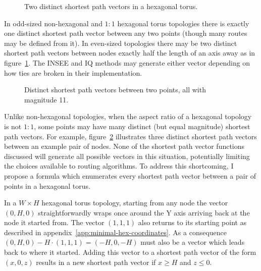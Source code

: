 			\begin{figure}
				\center
				
				\caption{Two distinct shortest path vectors in a hexagonal torus.}
				\label{fig:wrap-alternatives}
			\end{figure}
			
			In odd-sized non-hexagonal and $1:1$ hexagonal torus topologies there is
			exactly one distinct shortest path vector between any two points (though
			many routes may be defined from it). In even-sized topologies there may
			be two distinct shortest path vectors between nodes exactly half the
			length of an axis away as in figure~\ref{fig:wrap-alternatives}. The
			INSEE and IQ methods may generate either vector depending on how ties are
			broken in their implementation.
			
			\begin{figure}
				\center
				
				\caption[Distinct shortest path vectors in non-square toruses.]%
				{Distinct shortest path vectors between two points, all with
				magnitude 11.}
				\label{fig:spiralling}
			\end{figure}
			
			Unlike non-hexagonal topologies, when the aspect ratio of a hexagonal
			topology is not $1:1$, some points may have many distinct (but equal
			magnitude) shortest path vectors.  For example,
			figure~\ref{fig:spiralling} illustrates three distinct shortest path
			vectors between an example pair of nodes. None of the shortest path vector
			functions discussed will generate all possible vectors in this situation,
			potentially limiting the choices available to routing algorithms.  To
			address this shortcoming, I propose a formula which enumerates every
			shortest path vector between a pair of points in a hexagonal torus.
			
			In a $W \times H$ hexagonal torus topology, starting from any node the
			vector $(0, H, 0)$ straightforwardly wraps once around the Y axis
			arriving back at the node it started from. The vector $(1,1,1)$ also
			returns to its starting point as described in
			appendix~\ref{app:minimal-hex-coordinates}. As a consequence $(0,H,0) -
			H\cdot(1,1,1) = (-H, 0, -H)$ must also be a vector which leads back to
			where it started. Adding this vector to a shortest path vector of the
			form $(x, 0, z)$ results in a new shortest path vector if $x\ge H$ and
			$z\le0$.
			
